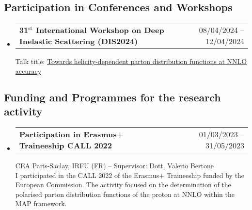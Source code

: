 \documentclass[10pt,a4paper]{article}
\makeatletter
\newcommand{\headerrow}[2]
{\begin{tabular*}{\linewidth}{l@{\extracolsep{\fill}}r}
	#1 &
	#2 \\
\end{tabular*}}
\makeatother
\begin{document}
\subsection*{Participation in Conferences and Workshops}
\begin{itemize}[leftmargin=1em]
    \item[]
    \headerrow
      {\textbf{31$^{\textrm{st}}$ International Workshop on Deep Inelastic Scattering (DIS2024)}}
      {08/04/2024 -- 12/04/2024}
      Talk title: \href{https://lpsc-indico.in2p3.fr/event/3268/contributions/7472/attachments/5307/7968/DIS_2024_MAP_4_3.pdf}{Towards helicity-dependent parton distribution functions at NNLO accuracy}
\end{itemize}

\subsection*{Funding and Programmes for the research activity}
\begin{itemize}[leftmargin=1em]
    \item[] 
      \headerrow
        {\textbf{Participation in Erasmus+ Traineeship CALL 2022}}
        {01/03/2023 -- 31/05/2023}
      CEA Paris-Saclay, IRFU (FR) -- Supervisor: Dott. Valerio Bertone\\[0.1em]
      I participated in the CALL 2022 of the Erasmus+ Traineeship funded by the European Commission. 
      The activity focused on the determination of the polarised parton distribution functions of the 
      proton at NNLO within the MAP framework.
\end{itemize}

\end{document}
